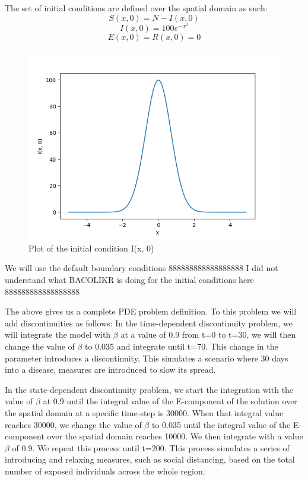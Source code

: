 \documentclass{article}
\begin{document}
The set of initial conditions are defined over the spatial domain as such:
\begin{equation}
S(x, 0) = N - I(x, 0)
\end{equation}
\begin{equation}
I(x, 0) = 100e^{-x^2}
\end{equation}
\begin{equation}
E(x, 0) = R(x, 0) = 0
\end{equation}

\begin{figure}[H]
\centering
\includegraphics[width=0.7\linewidth]{./figures/pde_I_0}
\caption{Plot of the initial condition I(x, 0)}
\label{fig:pde_I_0}
\end{figure}

We will use the default boundary conditions 888888888888888888 I did not understand what BACOLIKR is doing for the initial conditions here 888888888888888888

The above gives us a complete PDE problem definition. To this problem we will add discontinuities as follows: 
In the time-dependent discontinuity problem, we will integrate the model with $\beta$ at a value of 0.9 from t=0 to t=30, we will then change the value of $\beta$ to 0.035 and integrate until t=70. This change in the parameter introduces a discontinuity. This simulates a scenario where 30 days into a disease, measures are introduced to slow its spread.

In the state-dependent discontinuity problem, we start the integration with the value of $\beta$ at 0.9 until the integral value of the E-component of the solution over the spatial domain at a specific time-step is 30000. When that integral value reaches 30000, we change the value of $\beta$ to 0.035 until the integral value of the E-component over the spatial domain reaches 10000. We then integrate with a value $\beta$ of 0.9. We repeat this process until t=200. This process simulates a series of introducing and relaxing measures, such as social distancing, based on the total number of exposed individuals across the whole region.
\end{document}
